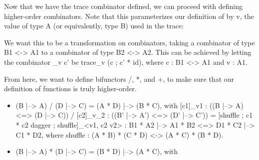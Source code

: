 \documentclass{llncs}
\begin{document}
Now that we have the trace combinator defined, we can proceed with defining
higher-order combinators. Note that this parameterizes our definition of
{{}} by {{v}}, the value of type {{A}} (or equivalently, type {{B}}) used
in the trace:


\noindent
We want this to be a transformation on combinators, taking a combinator of type
{{B1 <-> A1}} to a combinator of type {{B2 <-> A2}}. This can be achieved by
letting the combinator {{_v c'}} be {{trace_v (c ; c' * id)}}, where {{c
: B1 <-> A1}} and {{v : A1}}.

From here, we want to define bifunctors {{/}}, {{*}}, and {{+}}, to make sure
that our definition of functions is truly higher-order.

\begin{itemize}

\item {{(B |--> A) / (D |--> C) = (A * D) |--> (B * C)}}, with {{{[c1]}_{v1} :
((B |--> A) <=> (D |--> C)) / {[c2]}_{v_2} : ((B' |--> A') <=> (D' |--> C')) =
{[shuffle ; c1 * c2 dagger ; shuffle]}_{<v1, c2 v2>} : B1 * A2 |--> A1 * B2 <=>
D1 * C2 |--> C1 * D2}}, where {{shuffle : (A * B) * (C * D) <-> (A * C) * (B *
D)}}.

\item {{(B |--> A) * (D |--> C) = (B * D) |--> (A * C)}}, with

\end{itemize}
\end{document}

